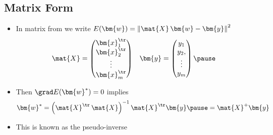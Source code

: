 \begin{slide}
\section{Matrix Form}

\begin{PauseHighLight}
  \begin{itemize}
    \item In matrix from we write $E(\bm{w})= \left\| \mat{X}\,\bm{w} -
      \bm{y} \right\|^2$
    \begin{align*}
      \mat{X} &=
                \begin{pmatrix}
                  \bm{x}_1^\tr \\ \bm{x}_2^\tr \\ \vdots \\ \bm{x}_m^\tr
                \end{pmatrix}
              &
      \bm{y} &=
               \begin{pmatrix}
                 y_1 \\ y_2, \\ \vdots \\ y_m
               \end{pmatrix}\pause
    \end{align*}
  \item Then $\grad E(\bm{w}^*)=0$ implies
    \begin{align*}
      \bm{w}^* = \left(\mat{X}^\tr\,\mat{X}\right)^{-1} \mat{X}^\tr \bm{y}\pause
      = \mat{X}^{+} \bm{y}
    \end{align*}
  \item This is known as the pseudo-inverse\pause
  \end{itemize}
\end{PauseHighLight}

\end{slide}



